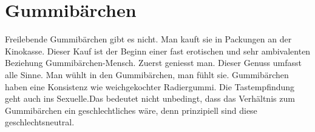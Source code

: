
\chapter{Gummibärchen}

Freilebende Gummibärchen gibt es nicht. Man kauft sie in Packungen an der Kinokasse. Dieser Kauf ist der Beginn einer fast erotischen und sehr ambivalenten Beziehung Gummibärchen-Mensch. Zuerst geniesst man. Dieser Genuss umfasst alle Sinne. Man wühlt in den Gummibärchen, man fühlt sie. Gummibärchen haben eine Konsistenz wie weichgekochter Radiergummi. Die Tastempfindung geht auch ins Sexuelle.Das bedeutet nicht unbedingt, dass das Verhältnis zum Gummibärchen ein geschlechtliches wäre, denn prinzipiell sind diese geschlechtsneutral.
